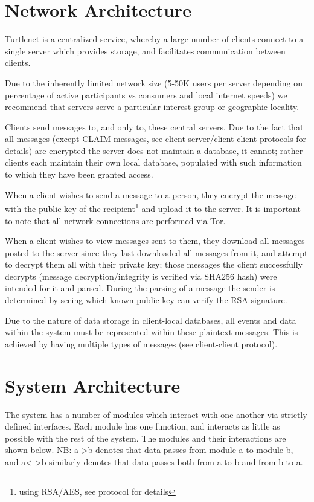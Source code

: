 \section{Network Architecture}
Turtlenet is a centralized service, whereby a large number of clients connect to
a single server which provides storage, and facilitates communication between
clients.

Due to the inherently limited network size (5-50K users per server depending on
percentage of active participants vs consumers and local internet speeds) we
recommend that servers serve a particular interest group or geographic locality.

Clients send messages to, and only to, these central servers. Due to the fact
that all messages (except CLAIM messages, see client-server/client-client
protocols for details) are encrypted the server does not maintain a database, it
cannot; rather clients each maintain their own local database, populated with
such information to which they have been granted access.

When a client wishes to send a message to a person, they encrypt the message with
the public key of the recipient\footnote{using RSA/AES, see protocol for
details} and upload it to the server. It is important to note that all network
connections are performed via Tor.

When a client wishes to view messages sent to them, they download all messages
posted to the server since they last downloaded all messages from it, and attempt
to decrypt them all with their private key; those messages the client
successfully decrypts (message decryption/integrity is verified via SHA256 hash)
were intended for it and parsed. During the parsing of a message the sender is
determined by seeing which known public key can verify the RSA signature.

Due to the nature of data storage in client-local databases, all events and data
within the system must be represented within these plaintext messages. This is
achieved by having multiple types of messages (see client-client protocol).

\section{System Architecture}
The system has a number of modules which interact with one another via strictly
defined interfaces. Each module has one function, and interacts as little as
possible with the rest of the system. The modules and their interactions are
shown below.
NB: a->b denotes that data passes from module a to module b, and a<->b similarly
denotes that data passes both from a to b and from b to a.


